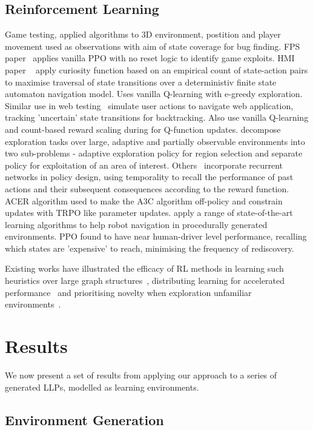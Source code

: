 \documentclass[conference,compsoc]{IEEEtran}
\begin{document}
\subsection{Reinforcement Learning}
Game testing, applied algorithms to 3D environment, postition and player movement used as observations with aim of state coverage for bug finding. FPS paper~\cite{9231552} applies vanilla PPO with no reset logic to identify game exploits. HMI paper ~\cite{9678703} apply curiosity function based on an empirical count of state-action pairs to maximise traversal of state transitions over a deterministiv finite state automaton navigation model. Uses vanilla Q-learning with e-greedy exploration. Similar use in web testing~\cite{9402046} simulate user actions to navigate web application, tracking 'uncertain' state transitions for backtracking. Also use vanilla Q-learning and count-based reward scaling during for Q-function updates. \cite{9476756} decompose exploration tasks over large, adaptive and partially observable environments into two sub-problems - adaptive exploration policy for region selection and separate policy for exploitation of an area of interest. Others~\cite{s21041067} incorporate recurrent networks in policy design, using temporality to recall the performance of past actions and their subsequent consequences according to the reward function. ACER algorithm used to make the A3C algorithm off-policy and constrain updates with TRPO like parameter updates. \cite{electronics10222751} apply a range of state-of-the-art learning algorithms to help robot navigation in procedurally generated environments. PPO found to have near human-driver level performance, recalling which states are 'expensive' to reach, minimising the frequency of rediscovery.

Existing works have illustrated the efficacy of RL methods in learning such heuristics over large graph structures~\cite{manchanda2019learning}, distributing learning for accelerated performance~\cite{hoffman2020acme} and prioritising novelty when exploration unfamiliar environments~\cite{ostrovski2017countbased, haarnoja2018soft, gordillo2021improving}.

\section{Results}
We now present a set of results from applying our approach to a series of generated LLPs, modelled as learning environments. 
\subsection{Environment Generation}
\end{document}
